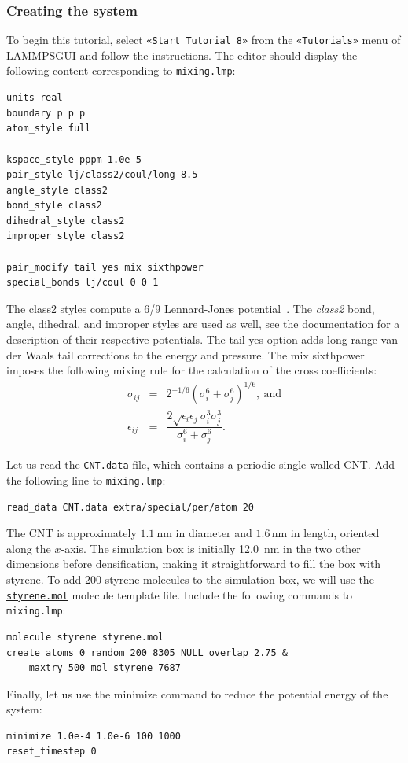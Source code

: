 \documentclass[9pt,tutorial]{livecoms}
\newcommand{\lmpcmd}[1]{\colorbox{listing}{\textcolor{command}{\small{#1}}}} %
\newcommand{\flecmd}[1]{\textcolor{command}{\texttt{#1}}} %
\newcommand{\guicmd}[1]{\textcolor{command}{\texttt{«#1»}}} %
\newcommand{\dwlcmd}[1]{\textcolor{download}{\texttt{#1}}} %
\newcommand{\lammpsgui}{\textsf{LAMMPS\textendash GUI}}
\newcommand{\filepath}{https://raw.githubusercontent.com/lammpstutorials/lammpstutorials-article/main/files/}
\begin{document}
\subsubsection{Creating the system}

To begin this tutorial, select \guicmd{Start Tutorial 8} from the
\guicmd{Tutorials} menu of \lammpsgui{} and follow the instructions.
The editor should display the following content corresponding to \flecmd{mixing.lmp}:
\begin{lstlisting}
units real
boundary p p p
atom_style full

kspace_style pppm 1.0e-5
pair_style lj/class2/coul/long 8.5
angle_style class2
bond_style class2
dihedral_style class2
improper_style class2

pair_modify tail yes mix sixthpower
special_bonds lj/coul 0 0 1
\end{lstlisting}
The \lmpcmd{class2} styles compute a 6/9 Lennard-Jones potential~\cite{sun1998compass}.
The \textit{class2} bond, angle, dihedral, and improper styles are used as
well, see the documentation for a description of their respective potentials.
{\color{blue}The \lmpcmd{tail yes} option adds long-range van der Waals tail
corrections to the energy and pressure.}
The \lmpcmd{mix sixthpower} imposes the following mixing rule for the calculation
of the cross coefficients:
\begin{eqnarray}
\nonumber
\sigma_{ij} & = & 2^{-1/6} (\sigma^6_i+\sigma_j^6)^{1/6}, ~ \text{and} \\
\nonumber
\epsilon_{ij} & = & \dfrac{2 \sqrt{\epsilon_i \epsilon_j} \sigma^3_i \sigma^3_j}{\sigma^6_i+\sigma_j^6}.
\end{eqnarray}

Let us read the \href{\filepath tutorial8/CNT.data}{\dwlcmd{CNT.data}} file, which
contains a periodic single-walled CNT.  Add the following line to \flecmd{mixing.lmp}:
\begin{lstlisting}
read_data CNT.data extra/special/per/atom 20
\end{lstlisting}
The CNT is approximately $1.1~\text{nm}$ in diameter and $1.6\,\text{nm}$ in length, oriented
along the $x$-axis. The simulation box is initially 12.0~nm in the two other dimensions before densification,
making it straightforward to fill the box with styrene.
To add 200 styrene molecules to the simulation box, we will use the
\href{\filepath tutorial8/styrene.mol}{\dwlcmd{styrene.mol}} molecule template file.
Include the following commands to \flecmd{mixing.lmp}:
\begin{lstlisting}
molecule styrene styrene.mol
create_atoms 0 random 200 8305 NULL overlap 2.75 &
    maxtry 500 mol styrene 7687
\end{lstlisting}
Finally, let us use the \lmpcmd{minimize} command to reduce the potential energy of the system:
\begin{lstlisting}
minimize 1.0e-4 1.0e-6 100 1000
reset_timestep 0
\end{lstlisting}
\end{document}
